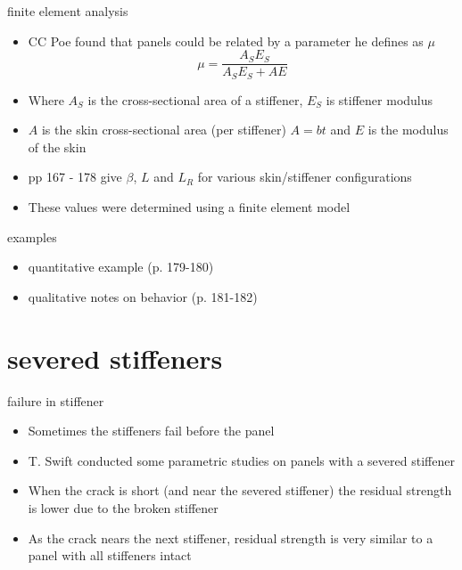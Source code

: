 \documentclass[10pt]{beamer}
\begin{document}
\begin{frame}{finite element analysis}
	\begin{itemize}[<+->]
		\item CC Poe found that panels could be related by a parameter he defines as $\mu$
		\begin{equation}
		\mu = \frac{A_S E_S}{A_S E_S + A E}
		\end{equation}
		\item Where $A_S$ is the cross-sectional area of a stiffener, $E_S$ is stiffener modulus
		\item $A$ is the skin cross-sectional area (per stiffener) $A=b t$ and $E$ is the modulus of the skin
		\item pp 167 - 178 give $\beta$, $L$ and $L_R$ for various skin/stiffener configurations
		\item These values were determined using a finite element model
	\end{itemize}
\end{frame}

\begin{frame}{examples}
	\begin{itemize}
		\item quantitative example (p. 179-180)
		\item qualitative notes on behavior (p. 181-182)
	\end{itemize}
\end{frame}

\section{severed stiffeners}

\begin{frame}{failure in stiffener}
	\begin{itemize}[<+->]
		\item Sometimes the stiffeners fail before the panel
		\item T. Swift conducted some parametric studies on panels with a severed stiffener
		\item When the crack is short (and near the severed stiffener) the residual strength is lower due to the broken stiffener
		\item As the crack nears the next stiffener, residual strength is very similar to a panel with all stiffeners intact
	\end{itemize}
\end{frame}
\end{document}
